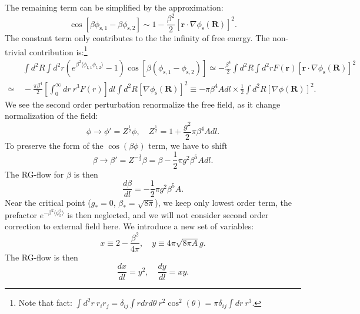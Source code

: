 \documentclass[aps,prb,superscriptaddress,nofootinbib]{revtex4}
\begin{document}
The remaining term can be simplified by the approximation:
\begin{equation}
	\cos\left[\beta\phi_{\mathrm{s},1} -\beta\phi_{\mathrm{s},2}\right]
	\sim 1-\frac{\beta^2}{2} [\bm r \cdot \nabla\phi_{\mathrm{s}}(\bm R)]^2.
\end{equation}
The constant term only contributes to the the infinity of free energy.
The non-trivial contribution is:\footnote{Note that fact: $\int d^2r\ r_i r_j = \delta_{ij} \int r dr d\theta\ r^2 \cos^2(\theta) = \pi \delta_{ij} \int dr\ r^3$.}
\begin{equation}
\begin{aligned}
	&\ \int d^2 R \int d^2 r \left(e^{\beta^2 \langle\phi_{\mathrm{f},1}\phi_{\mathrm{f},2}\rangle}-1 \right)\cos\left[\beta(\phi_{\mathrm{s},1}-\phi_{\mathrm{s},2})\right] 
	\simeq -\frac{\beta^4}{2} \int d^2 R \int d^2r F(\bm r) [\bm r \cdot \nabla\phi_{\mathrm{s}}(\bm R)]^2 \\
	\simeq &\ -\frac{\pi \beta^4}{2} \left[\int_0^\infty dr\ r^3 F(r)\right]dl \int d^2 R [\nabla\phi_{\mathrm{s}}(\bm R)]^2 
	\equiv -\pi \beta^4 A dl \times \frac{1}{2}\int d^2 R [\nabla\phi(\bm R)]^2.
\end{aligned}
\end{equation}
We see the second order perturbation renormalize the free field, as it change normalization of the field:
\begin{equation}
	\phi \rightarrow \phi' = Z^{\frac{1}{2}} \phi, \quad 
	Z^{\frac{1}{2}} = 1 +\frac{g^2}{2} \pi \beta^4 A dl.
\end{equation}
To preserve the form of the $\cos(\beta\phi)$ term, we have to shift
\begin{equation}
	\beta \rightarrow \beta' = Z^{-\frac{1}{2}}\beta = \beta-\frac{1}{2}\pi g^2\beta^5 A dl.
\end{equation}
The RG-flow for $\beta$ is then
\begin{equation}
	\frac{d\beta}{dl} = -\frac{1}{2}\pi g^2\beta^5 A.
\end{equation}
Near the critical point ($g_* = 0$, $\beta_* = \sqrt{8\pi}$), we keep only lowest order term, the prefactor $e^{-\beta^2\langle\phi_{\mathrm{f}}^2\rangle}$ is then neglected, and we will not consider second order correction to external field here.
We introduce a new set of variables:
\begin{equation}
	x \equiv 2 - \frac{\beta^2}{4\pi}, \quad
	y \equiv 4\pi \sqrt{8\pi A} g.
\end{equation}
The RG-flow is then
\begin{equation}
	\frac{dx}{dl} = y^2, \quad
	\frac{dy}{dl} = xy.
\end{equation}
\end{document}

